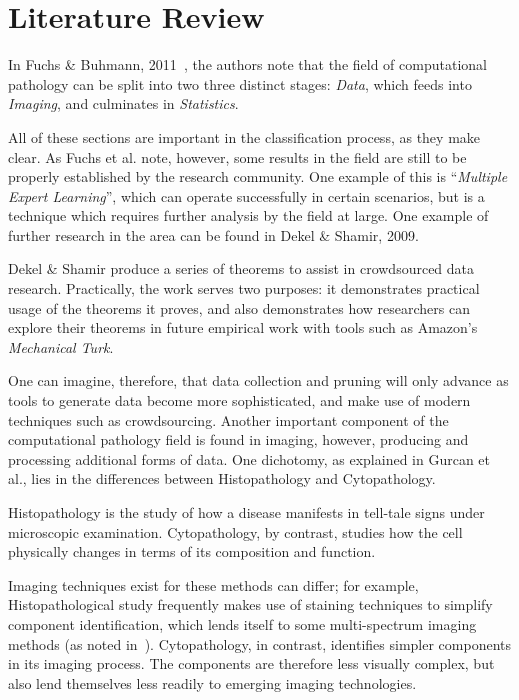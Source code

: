 \documentclass{tufte-handout}
\begin{document}
\section{Literature Review}
In Fuchs \& Buhmann, 2011~\cite{fuchs2011computational}, the authors note that the field of computational pathology can be split into two three distinct stages: \emph{Data}, which feeds into \emph{Imaging}, and culminates in \emph{Statistics}.\par

All of these sections are important in the classification process, as they make clear. As Fuchs et al. note, however, some results in the field are still to be properly established by the research community. One example of this is ``\emph{Multiple Expert Learning}'', which can operate successfully in certain scenarios, but is a technique which requires further analysis by the field at large. One example of further research in the area can be found in Dekel \& Shamir, 2009.\cite{dekel2009vox}\par

\bigskip

Dekel \& Shamir produce a series of theorems to assist in crowdsourced data research. Practically, the work serves two purposes: it demonstrates practical usage of the theorems it proves, and also demonstrates how researchers can explore their theorems in future empirical work with tools such as Amazon's \emph{Mechanical Turk}.

One can imagine, therefore, that data collection and pruning will only advance as tools to generate data become more sophisticated, and make use of modern techniques such as crowdsourcing. Another important component of the computational pathology field is found in imaging, however, producing and processing additional forms of data. One dichotomy, as explained in Gurcan et al.\cite{Gurcan2009}, lies in the differences between Histopathology and Cytopathology.\par

\bigskip

Histopathology is the study of how a disease manifests in tell-tale signs under microscopic examination. Cytopathology, by contrast, studies how the cell physically changes in terms of its composition and function. \par

Imaging techniques exist for these methods can differ; for example, Histopathological study frequently makes use of staining techniques to simplify component identification, which lends itself to some multi-spectrum imaging methods (as noted in~\cite{fuchs2011computational}). Cytopathology, in contrast, identifies simpler components in its imaging process. The components are therefore less visually complex, but also lend themselves less readily to emerging imaging technologies.\par
\end{document}
